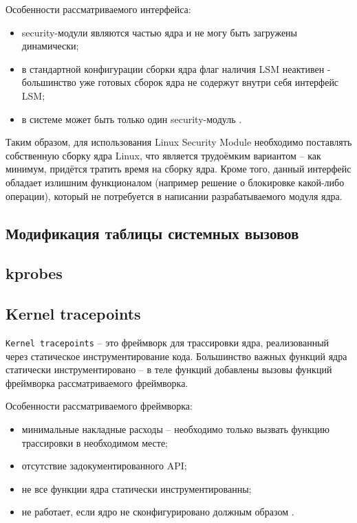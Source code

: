 Особенности рассматриваемого интерфейса:

\begin{itemize}
	\item security-модули являются частью ядра и не могу быть загружены динамически;
	\item в стандартной конфигурации сборки ядра флаг наличия LSM неактивен - большинство уже готовых сборок ядра не содержут внутри себя интерфейс LSM;
	\item в системе может быть только один security-модуль \cite{linux-security-api}.
\end{itemize}

Таким образом, для использования Linux Security Module необходимо поставлять собственную сборку ядра Linux, что является трудоёмким вариантом -- как минимум, придётся тратить время на сборку ядра. Кроме того, данный интерфейс обладает излишним функционалом (например решение о блокировке какой-либо операции), который не потребуется в написании разрабатываемого модуля ядра.

\subsection{Модификация таблицы системных вызовов}

\subsection{kprobes}

\subsection{Kernel tracepoints}

\texttt{Kernel tracepoints} \cite{kernel-tracepoints} -- это фреймворк для трассировки ядра, реализованный через статическое инструментирование кода. Большинство важных функций ядра статически инструментировано -- в теле функций добавлены вызовы функций фреймворка рассматриваемого фреймворка.

Особенности рассматриваемого фреймворка:

\begin{itemize}
	\item минимальные накладные расходы -- необходимо только вызвать функцию трассировки в необходимом месте;
	\item отсутствие задокументированного API;
	\item не все функции ядра статически инструментированны; 
	\item не работает, если ядро не сконфигурировано должным образом \cite{habr-profiling-linux}.
\end{itemize}

